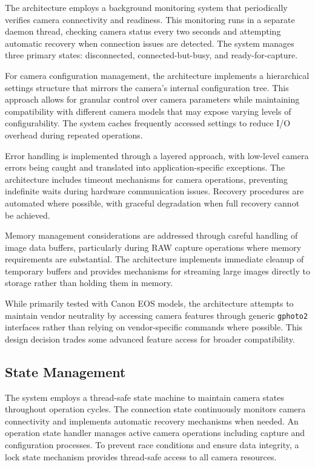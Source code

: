 The architecture employs a background monitoring system that periodically verifies camera connectivity and readiness. This monitoring runs in a separate daemon thread, checking camera status every two seconds and attempting automatic recovery when connection issues are detected. The system manages three primary states: disconnected, connected-but-busy, and ready-for-capture.

For camera configuration management, the architecture implements a hierarchical settings structure that mirrors the camera's internal configuration tree. This approach allows for granular control over camera parameters while maintaining compatibility with different camera models that may expose varying levels of configurability. The system caches frequently accessed settings to reduce I/O overhead during repeated operations.

Error handling is implemented through a layered approach, with low-level camera errors being caught and translated into application-specific exceptions. The architecture includes timeout mechanisms for camera operations, preventing indefinite waits during hardware communication issues. Recovery procedures are automated where possible, with graceful degradation when full recovery cannot be achieved.

Memory management considerations are addressed through careful handling of image data buffers, particularly during RAW capture operations where memory requirements are substantial. The architecture implements immediate cleanup of temporary buffers and provides mechanisms for streaming large images directly to storage rather than holding them in memory.

While primarily tested with Canon EOS models, the architecture attempts to maintain vendor neutrality by accessing camera features through generic \texttt{gphoto2} interfaces rather than relying on vendor-specific commands where possible. This design decision trades some advanced feature access for broader compatibility.

\subsection{State Management}
The system employs a thread-safe state machine to maintain camera states throughout operation cycles. The connection state continuously monitors camera connectivity and implements automatic recovery mechanisms when needed. An operation state handler manages active camera operations including capture and configuration processes. To prevent race conditions and ensure data integrity, a lock state mechanism provides thread-safe access to all camera resources.

